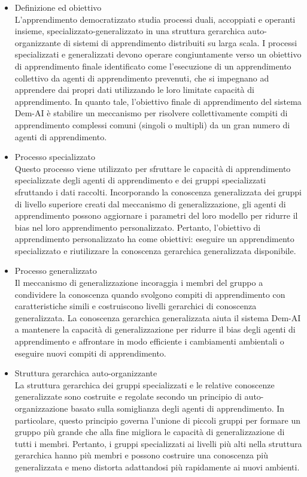 \begin{itemize}

  \item Definizione ed obiettivo\\
  L'apprendimento democratizzato studia processi duali, accoppiati e operanti insieme, specializzato-generalizzato in una struttura gerarchica auto-organizzante di sistemi di apprendimento distribuiti su larga scala. I processi specializzati e generalizzati devono operare congiuntamente verso un obiettivo di apprendimento finale identificato come l'esecuzione di un apprendimento collettivo da agenti di apprendimento prevenuti, che si impegnano ad apprendere dai propri dati utilizzando le loro limitate capacità di apprendimento. In quanto tale, l'obiettivo finale di apprendimento del sistema Dem-AI è stabilire un meccanismo per risolvere collettivamente compiti di apprendimento complessi comuni (singoli o multipli) da un gran numero di agenti di apprendimento.
  \item Processo specializzato\\
  Questo processo viene utilizzato per sfruttare le capacità di apprendimento specializzate degli agenti di apprendimento e dei gruppi specializzati sfruttando i dati raccolti. Incorporando la conoscenza generalizzata dei gruppi di livello superiore creati dal meccanismo di generalizzazione, gli agenti di apprendimento possono aggiornare i parametri del loro modello per ridurre il bias nel loro apprendimento personalizzato.
Pertanto, l'obiettivo di apprendimento personalizzato ha come obiettivi: eseguire un apprendimento specializzato e riutilizzare la conoscenza gerarchica generalizzata disponibile.
  \item Processo generalizzato\\
  Il meccanismo di generalizzazione incoraggia i membri del gruppo a condividere la conoscenza quando svolgono compiti di apprendimento con caratteristiche simili e costruiscono livelli gerarchici di conoscenza generalizzata. La conoscenza gerarchica generalizzata aiuta il sistema Dem-AI a mantenere la capacità di generalizzazione per ridurre il bias degli agenti di apprendimento e affrontare in modo efficiente i cambiamenti ambientali o eseguire nuovi compiti di apprendimento.
  
  \item Struttura gerarchica auto-organizzante\\
  La struttura gerarchica dei gruppi specializzati e le relative conoscenze generalizzate sono costruite e regolate secondo un principio di auto-organizzazione basato sulla somiglianza degli agenti di apprendimento. In particolare, questo principio governa l'unione di piccoli gruppi per formare un gruppo più grande che alla fine migliora le capacità di generalizzazione di tutti i membri. Pertanto, i gruppi specializzati ai livelli più alti nella struttura gerarchica hanno più membri e possono costruire una conoscenza più generalizzata e meno distorta adattandosi più rapidamente ai nuovi ambienti.
  

\end{itemize}

